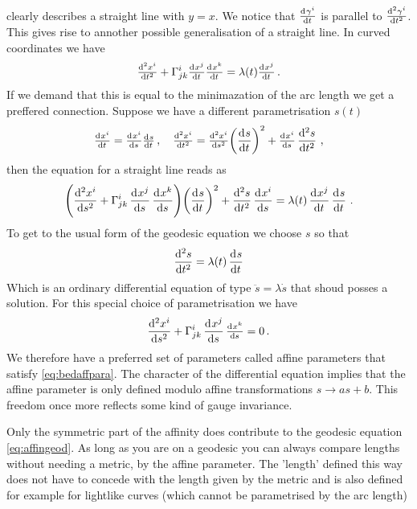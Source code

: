 clearly describes a straight line with $y=x$.
We notice that $\od{\tensor{\gamma}{^i}}{t}$ is parallel to
$\od[2]{\tensor{\gamma}{^i}}{t}$. This gives rise to annother possible
generalisation of a straight line.
In curved coordinates we have 
\begin{equation}
\od[2]{\tensor{x}{^i}}{t}+\affin{i}{j}{k}\od{\tensor{x}{^j}}{t}\od{\tensor{x}{^k}}{t}
=\lambda(t)\od{\tensor{x}{^j}}{t}\,.
\end{equation}
If we demand that this is equal to the minimazation of the arc length we get a
preffered connection. 
Suppose we have a different parametrisation $s(t)$
\begin{equation}
\od{\tensor{x}{^i}}{t}=\od{\tensor{x}{^i}}{s}\od{s}{t}\,,\quad
\od[2]{\tensor{x}{^i}}{t}=\od[2]{\tensor{x}{^i}}{s}\left(\dod{s}{t}\right)^2
+\od{\tensor{x}{^i}}{s}\dod[2]{s}{t}\, ,
\end{equation} 
then the equation for a straight line reads as
\begin{equation}
\left(\dod[2]{\tensor{x}{^i}}{s}+\affin{i}{j}{k}\dod{\tensor{x}{^j}}{s}\dod{\tensor{x}{^k}}{s}
\right)\left(\dod{s}{t}\right)^2+\dod[2]{s}{t}\dod{\tensor{x}{^i}}{s}
=\lambda(t)\dod{\tensor{x}{^j}}{t}\dod{s}{t}\,.
\end{equation}
To get to the usual form of the geodesic equation we choose $s$ so that
\begin{equation}
\dod[2]{s}{t}=\lambda(t)\dod{s}{t}\label{eq:bedaffpara}
\end{equation}
Which is an ordinary differential equation of type $\ddot{s}=\lambda\dot{s}$
that shoud posses a solution. 
For this special choice of parametrisation we have
\begin{equation}
\dod[2]{\tensor{x}{^i}}{s}+\affin{i}{j}{k}\dod{\tensor{x}{^j}}{s}\od{\tensor{x}{^k}}{s}
=0\,.\label{eq:affingeod}
\end{equation}
We therefore have a preferred set of parameters
called affine parameters that satisfy \eqref{eq:bedaffpara}. The character
of the differential equation implies that the affine parameter is only
defined modulo affine transformations $s\to as+b$. This freedom once more
reflects some kind of gauge invariance.
\begin{remark}
Only the symmetric part of the affinity does contribute to
the geodesic equation \eqref{eq:affingeod}. As long as you are on a geodesic you
can always compare lengths without needing a metric, by the affine parameter.
The 'length' defined this way does not have to concede with the length given by
the metric and is also defined for example for lightlike curves (which cannot
be parametrised by the arc length)
\end{remark}
